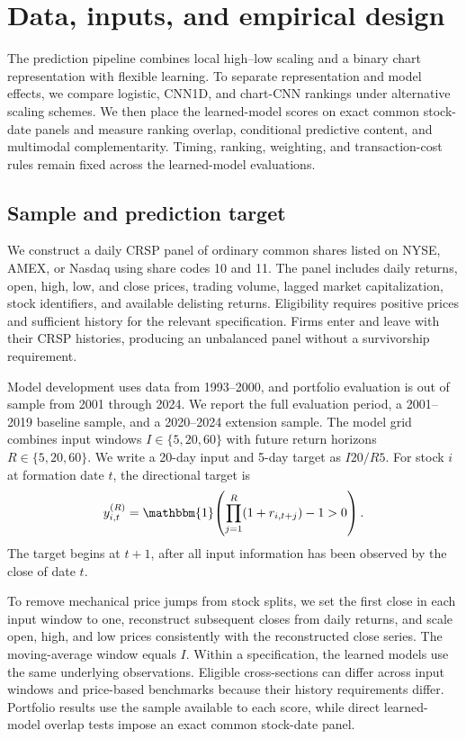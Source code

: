 \section{Data, inputs, and empirical design}\label{sec:design}

The prediction pipeline combines local high--low scaling and a binary chart representation with flexible learning. To separate representation and model effects, we compare logistic, CNN1D, and chart-CNN rankings under alternative scaling schemes. We then place the learned-model scores on exact common stock-date panels and measure ranking overlap, conditional predictive content, and multimodal complementarity. Timing, ranking, weighting, and transaction-cost rules remain fixed across the learned-model evaluations.

\subsection{Sample and prediction target}\label{subsec:sample}

We construct a daily CRSP panel of ordinary common shares listed on NYSE, AMEX, or Nasdaq using share codes 10 and 11. The panel includes daily returns, open, high, low, and close prices, trading volume, lagged market capitalization, stock identifiers, and available delisting returns. Eligibility requires positive prices and sufficient history for the relevant specification. Firms enter and leave with their CRSP histories, producing an unbalanced panel without a survivorship requirement.

Model development uses data from 1993--2000, and portfolio evaluation is out of sample from 2001 through 2024. We report the full evaluation period, a 2001--2019 baseline sample, and a 2020--2024 extension sample. The model grid combines input windows $I\in\{5,20,60\}$ with future return horizons $R\in\{5,20,60\}$. We write a 20-day input and 5-day target as $I20/R5$. For stock $i$ at formation date $t$, the directional target is
\begin{equation}
 y_{i,t}^{(R)}=\mathbbm{1}\!\left(\prod_{j=1}^{R}(1+r_{i,t+j})-1>0\right).
 \label{eq:label}
\end{equation}
The target begins at $t+1$, after all input information has been observed by the close of date $t$.

To remove mechanical price jumps from stock splits, we set the first close in each input window to one, reconstruct subsequent closes from daily returns, and scale open, high, and low prices consistently with the reconstructed close series. The moving-average window equals $I$. Within a specification, the learned models use the same underlying observations. Eligible cross-sections can differ across input windows and price-based benchmarks because their history requirements differ. Portfolio results use the sample available to each score, while direct learned-model overlap tests impose an exact common stock-date panel.

